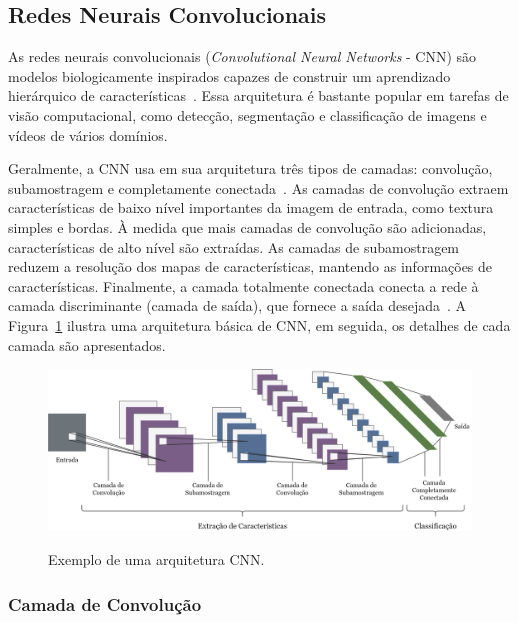 \subsection{Redes Neurais Convolucionais}
\label{sec:redes-neurais-convolucionais}

As redes neurais convolucionais (\textit{Convolutional Neural Networks} - CNN) são modelos biologicamente inspirados capazes de construir um aprendizado hierárquico de características~\cite{726791, 6932467}. Essa arquitetura é bastante popular em tarefas de visão computacional, como detecção, segmentação e classificação de imagens e vídeos de vários domínios.

Geralmente, a CNN usa em sua arquitetura três tipos de camadas: convolução, subamostragem e completamente conectada~\cite{726791}. As camadas de convolução extraem características de baixo nível importantes da imagem de entrada, como textura simples e bordas. À medida que mais camadas de convolução são adicionadas, características de alto nível são extraídas. As camadas de subamostragem reduzem a resolução dos mapas de características, mantendo as informações de características. Finalmente, a camada totalmente conectada conecta a rede à camada discriminante (camada de saída), que fornece a saída desejada~\cite{LeCun2015}. A Figura~\ref{fig:cnn} ilustra uma arquitetura básica de CNN, em seguida, os detalhes de cada camada são apresentados.

\begin{figure}[!ht]
    \centering
    \caption{Exemplo de uma arquitetura CNN.}
    \includegraphics[width=1\textwidth]{figuras/arquitetura-CNN.png}
    \label{fig:cnn}
\end{figure}

\subsubsection{Camada de Convolução}
\label{sec:camada-convolucao}

